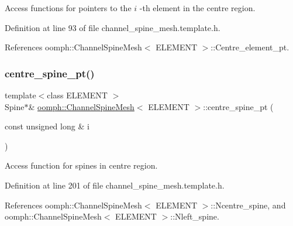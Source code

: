 Access functions for pointers to the $ i $ -\/th element in the centre region. 



Definition at line 93 of file channel\+\_\+spine\+\_\+mesh.\+template.\+h.



References oomph\+::\+Channel\+Spine\+Mesh$<$ E\+L\+E\+M\+E\+N\+T $>$\+::\+Centre\+\_\+element\+\_\+pt.

\mbox{\label{classoomph_1_1ChannelSpineMesh_a690cda061ec45945d981a24a2b206e69}} 
\subsubsection{\texorpdfstring{centre\+\_\+spine\+\_\+pt()}{centre\_spine\_pt()}}
{\footnotesize\ttfamily template$<$class E\+L\+E\+M\+E\+NT $>$ \\
Spine$\ast$\& \hyperlink{classoomph_1_1ChannelSpineMesh}{oomph\+::\+Channel\+Spine\+Mesh}$<$ E\+L\+E\+M\+E\+NT $>$\+::centre\+\_\+spine\+\_\+pt (\begin{DoxyParamCaption}\item[{const unsigned long \&}]{i }\end{DoxyParamCaption})\hspace{0.3cm}{\ttfamily [inline]}}



Access function for spines in centre region. 



Definition at line 201 of file channel\+\_\+spine\+\_\+mesh.\+template.\+h.



References oomph\+::\+Channel\+Spine\+Mesh$<$ E\+L\+E\+M\+E\+N\+T $>$\+::\+Ncentre\+\_\+spine, and oomph\+::\+Channel\+Spine\+Mesh$<$ E\+L\+E\+M\+E\+N\+T $>$\+::\+Nleft\+\_\+spine.

\mbox{\label{classoomph_1_1ChannelSpineMesh_ad449460c4d06b2be64b53097143a3b09}} 
